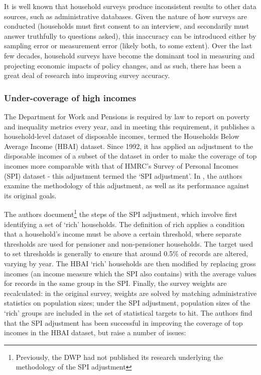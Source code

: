 \documentclass[10pt,journal,compsoc]{IEEEtran}
\begin{document}
It is well known that household surveys produce inconsistent results to other data sources, such as administrative databases. Given the nature of how surveys are conducted (households must first consent to an interview, and secondarily must answer truthfully to questions asked), this inaccuracy can be introduced either by sampling error or measurement error (likely both, to some extent). Over the last few decades, household surveys have become the dominant tool in measuring and projecting economic impacts of policy changes, and as such, there has been a great deal of research into improving survey accuracy.

\subsubsection{Under-coverage of high incomes}

The Department for Work and Pensions is required by law to report on poverty and inequality metrics every year, and in meeting this requirement, it publishes a household-level dataset of disposable incomes, termed the Households Below Average Income (HBAI) dataset.\cite{hbai} Since 1992, it has applied an adjustment to the disposable incomes of a subset of the dataset in order to make the coverage of top incomes more comparable with that of HMRC's Survey of Personal Incomes (SPI) dataset - this adjustment termed the `SPI adjustment'. In \cite{ifs_survey_under_coverage}, the authors examine the methodology of this adjustment, as well as its performance against its original goals.

The authors document\footnote{Previously, the DWP had not published its research underlying the methodology of the SPI adjustment} the steps of the SPI adjustment, which involve first identifying a set of `rich' households. The definition of rich applies a condition that a household's income must be above a certain threshold, where separate thresholds are used for pensioner and non-pensioner households. The target used to set thresholds is generally to ensure that around 0.5\% of records are altered, varying by year. The HBAI `rich' households are then modified by replacing gross incomes (an income measure which the SPI also contains) with the average values for records in the same group in the SPI. Finally, the survey weights are recalculated: in the original survey, weights are solved by matching administrative statistics on population sizes; under the SPI adjustment, population sizes of the `rich' groups are included in the set of statistical targets to hit. The authors find that the SPI adjustment has been successful in improving the coverage of top incomes in the HBAI dataset, but raise a number of issues:
\end{document}
